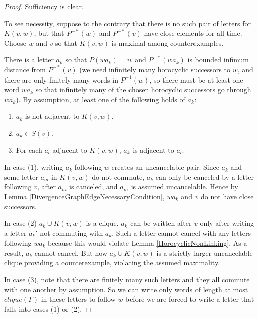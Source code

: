 \documentclass{amsart}
\theoremstyle{definition}
\theoremstyle{remark}
\begin{document}
	\begin{proof}
		
		Sufficiency is clear.
		
		To see necessity, suppose to the contrary that there is no such pair of letters for $K(v,w)$, but that $P^{-*}(w)$ and $P^{-*}(v)$ have close elements for all time. Choose $w$ and $v$ so that $K(v,w)$ is maximal among counterexamples.
		
		There is a letter $a_k$ so that $P(wa_k)=w$ and $P^{-*}(wa_k)$ is bounded infimum distance from $P^{-*}(v)$ (we need infinitely many horocyclic successors to $w$, and there are only finitely many words in $P^{-1}(w)$, so there must be at least one word $wa_k$ so that infinitely many of the chosen horocyclic successors go through $wa_k$). By assumption, at least one of the following holds of $a_k$: 
		
		\begin{enumerate}
			
			\item $a_k$ is not adjacent to $K(v,w)$.
			
			\item $a_k\in S(v)$.
			
			\item For each $a_l$ adjacent to $K(v,w)$, $a_k$ is adjacent to $a_l$.
			
		\end{enumerate}
		
		In case (1), writing $a_k$ following $w$ creates an uncancelable pair. Since $a_k$ and some letter $a_m$ in $K(v,w)$ do not commute, $a_k$ can only be canceled by a letter following $v$, after $a_m$ is canceled, and $a_m$ is assumed uncancelable. Hence by Lemma \ref{DivergenceGraphEdgeNecessaryCondition}, $wa_k$ and $v$ do not have close successors.
		
		In case (2) $a_k\cup K(v,w)$ is a clique. $a_k$ can be written after $v$ only after writing a letter $a_k'$ not commuting with $a_k$. Such a letter cannot cancel with any letters following $wa_k$ because this would violate Lemma \ref{HorocyclicNonLinking}. As a result, $a_k$ cannot cancel. But now $a_k\cup K(v,w)$ is a strictly larger uncancelable clique providing a counterexample, violating the assumed maximality.
		
		In case (3), note that there are finitely many such letters and they all commute with one another by assumption. So we can write only words of length at most $clique(\Gamma)$ in these letters to follow $w$ before we are forced to write a letter that falls into cases (1) or (2).
	\end{proof}
	
\end{document}
